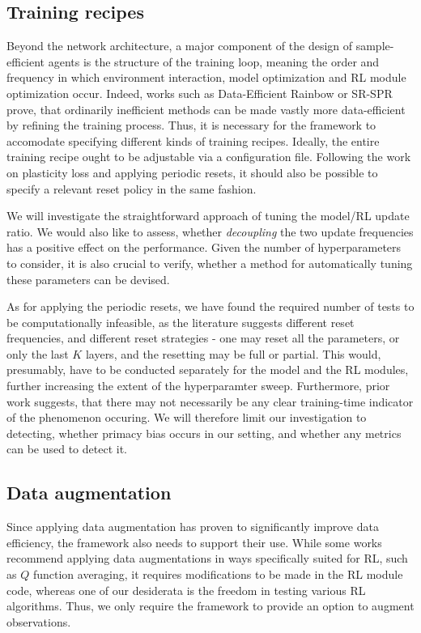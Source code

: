 \documentclass[en]{pracamgr}
\begin{document}
\subsection{Training recipes}

Beyond the network architecture, a major component of the design of sample-efficient agents is the structure of the training loop, meaning the order and frequency in which environment interaction, model optimization and RL module optimization occur. Indeed, works such as Data-Efficient Rainbow \autocite{vanhasseltWhenUseParametric2019} or SR-SPR \autocite{doroSampleEfficientReinforcementLearning2022} prove, that ordinarily inefficient methods can be made vastly more data-efficient by refining the training process. Thus, it is necessary for the framework to accomodate specifying different kinds of training recipes. Ideally, the entire training recipe ought to be adjustable via a configuration file. Following the work on plasticity loss and applying periodic resets, it should also be possible to specify a relevant reset policy in the same fashion.

We will investigate the straightforward approach of tuning the model/RL update ratio. We would also like to assess, whether \emph{decoupling} the two update frequencies has a positive effect on the performance. Given the number of hyperparameters to consider, it is also crucial to verify, whether a method for automatically tuning these parameters can be devised.

As for applying the periodic resets, we have found the required number of tests to be computationally infeasible, as the literature suggests different reset frequencies, and different reset strategies - one may reset all the parameters, or only the last $K$ layers, and the resetting may be full or partial. This would, presumably, have to be conducted separately for the model and the RL modules, further increasing the extent of the hyperparamter sweep. Furthermore, prior work \autocite{julianiStudyPlasticityLoss2024} suggests, that there may not necessarily be any clear training-time indicator of the phenomenon occuring. We will therefore limit our investigation to detecting, whether primacy bias occurs in our setting, and whether any metrics can be used to detect it.

\subsection{Data augmentation}

Since applying data augmentation has proven to significantly improve data efficiency, the framework also needs to support their use. While some works recommend applying data augmentations in ways specifically suited for RL, such as $Q$ function averaging, it requires modifications to be made in the RL module code, whereas one of our desiderata is the freedom in testing various RL algorithms. Thus, we only require the framework to provide an option to augment observations.
\end{document}
